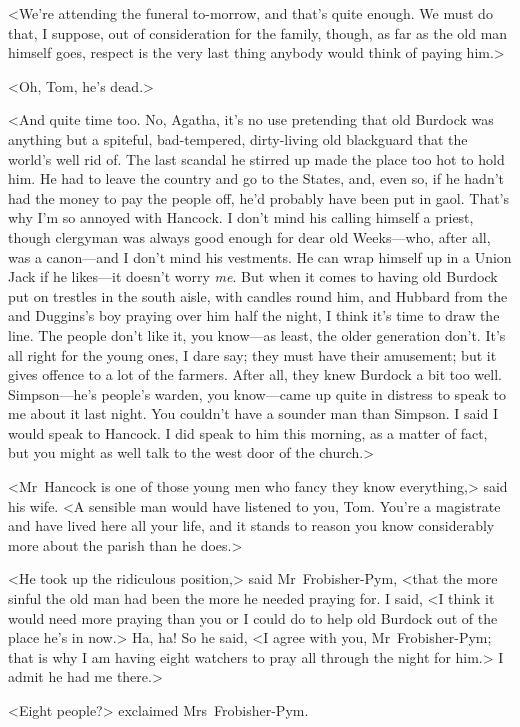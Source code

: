 <We're attending the funeral to-morrow, and that's quite enough. We must do that, I suppose, out of consideration for the family, though, as far as the old man himself goes, respect is the very last thing anybody would think of paying him.>

<Oh, Tom, he's dead.>

<And quite time too. No, Agatha, it's no use pretending that old Burdock was anything but a spiteful, bad-tempered, dirty-living old blackguard that the world's well rid of. The last scandal he stirred up made the place too hot to hold him. He had to leave the country and go to the States, and, even so, if he hadn't had the money to pay the people off, he'd probably have been put in gaol. That's why I'm so annoyed with Hancock. I don't mind his calling himself a priest, though clergyman was always good enough for dear old Weeks—who, after all, was a canon—and I don't mind his vestments. He can wrap himself up in a Union Jack if he likes—it doesn't worry \emph{me}. But when it comes to having old Burdock put on trestles in the south aisle, with candles round him, and Hubbard from the  and Duggins's boy praying over him half the night, I think it's time to draw the line. The people don't like it, you know—as least, the older generation don't. It's all right for the young ones, I dare say; they must have their amusement; but it gives offence to a lot of the farmers. After all, they knew Burdock a bit too well. Simpson—he's people's warden, you know—came up quite in distress to speak to me about it last night. You couldn't have a sounder man than Simpson. I said I would speak to Hancock. I did speak to him this morning, as a matter of fact, but you might as well talk to the west door of the church.>

<Mr~Hancock is one of those young men who fancy they know everything,> said his wife. <A sensible man would have listened to you, Tom. You're a magistrate and have lived here all your life, and it stands to reason you know considerably more about the parish than he does.>

<He took up the ridiculous position,> said Mr~Frobisher-Pym, <that the more sinful the old man had been the more he needed praying for. I said, <I think it would need more praying than you or I could do to help old Burdock out of the place he's in now.> Ha, ha! So he said, <I agree with you, Mr~Frobisher-Pym; that is why I am having eight watchers to pray all through the night for him.> I admit he had me there.>

<Eight people?> exclaimed Mrs~Frobisher-Pym.

